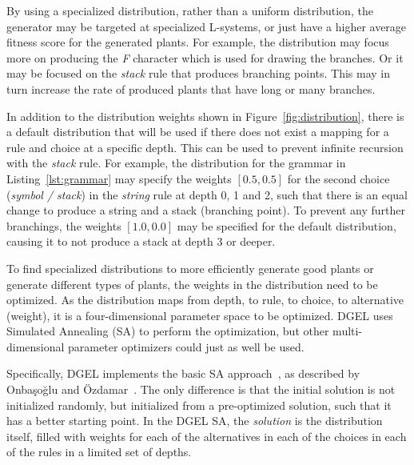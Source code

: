 By using a specialized distribution, rather than a uniform distribution, the generator may be targeted at specialized L-systems, or just have a higher average fitness score for the generated plants.
For example, the distribution may focus more on producing the \textit{F} character which is used for drawing the branches.
Or it may be focused on the \textit{stack} rule that produces branching points.
This may in turn increase the rate of produced plants that have long or many branches.

In addition to the distribution weights shown in Figure~\ref{fig:distribution}, there is a default distribution that will be used if there does not exist a mapping for a rule and choice at a specific depth.
This can be used to prevent infinite recursion with the \textit{stack} rule.
For example, the distribution for the grammar in Listing~\ref{lst:grammar} may specify the weights $[0.5, 0.5]$ for the second choice (\textit{symbol / stack}) in the \textit{string} rule at depth 0, 1 and 2, such that there is an equal change to produce a string and a stack (branching point).
To prevent any further branchings, the weights $[1.0, 0.0]$ may be specified for the default distribution, causing it to not produce a stack at depth 3 or deeper.

To find specialized distributions to more efficiently generate good plants or generate different types of plants, the weights in the distribution need to be optimized.
As the distribution maps from depth, to rule, to choice, to alternative (weight), it is a four-dimensional parameter space to be optimized.
DGEL uses Simulated Annealing (SA) to perform the optimization, but other multi-dimensional parameter optimizers could just as well be used.

Specifically, DGEL implements the basic SA approach~\cite{2000Ozdamar}, as described by Onbaşoğlu and Özdamar~\cite{2001Onbasoglu}.
The only difference is that the initial solution is not initialized randomly, but initialized from a pre-optimized solution, such that it has a better starting point.
In the DGEL SA, the \textit{solution} is the distribution itself, filled with weights for each of the alternatives in each of the choices in each of the rules in a limited set of depths.

